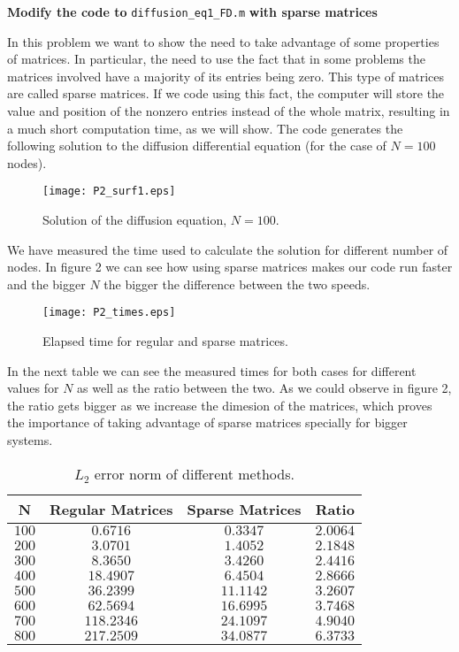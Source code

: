 \textbf{Modify the code to} \verb+diffusion_eq1_FD.m+  \textbf{with sparse matrices}

\vspace{0.3in}

In this problem we want to show the need to take advantage of some properties of matrices. In particular, the need to use the fact that in some problems the matrices involved have a majority of its entries being zero. This type of matrices are called sparse matrices. If we code using this fact, the computer will store the value and position of the nonzero entries instead of the whole matrix, resulting in a much short computation time, as we will show. The code generates the following solution to the diffusion differential equation (for the case of $N=100$ nodes).
\begin{figure}[H]
\centering     %
{\texttt{[image: P2\_surf1.eps]}}
\caption{Solution of the diffusion equation, $N=100$.}
\end{figure}

We have measured the time used to calculate the solution for different number of nodes. In figure 2 we can see how using sparse matrices makes our code run faster and the bigger $N$ the bigger the difference between the two speeds. 
\begin{figure}[H]
\centering     %
{\texttt{[image: P2\_times.eps]}}
\caption{Elapsed time for regular and sparse matrices.}
\end{figure}

In the next table we can see the measured times for both cases for different values for $N$ as well as the ratio between the two. As we could observe in figure 2, the ratio gets bigger as we increase the dimesion of the matrices, which proves the importance of taking advantage of sparse matrices specially for bigger systems.

\begin{table}[H]
\centering
\begin{tabular}{c|c|c|c}
N  & Regular Matrices & Sparse Matrices & Ratio\\
\hline
$100$ & $0.6716$ & $   0.3347$ & $   2.0064$\\
$200$ & $3.0701$ & $    1.4052$ & $    2.1848$\\
$300$ & $8.3650$ & $    3.4260$ & $    2.4416$\\
$400$ & $18.4907$ & $    6.4504$ & $    2.8666$\\
$500$ & $36.2399$ & $   11.1142$ & $    3.2607$\\
$600$ & $62.5694$ & $   16.6995$ & $    3.7468$\\
$700$ & $118.2346$ & $   24.1097$ & $    4.9040$\\
$800$ & $  217.2509$ & $   34.0877$ & $    6.3733$\\
\end{tabular}
\caption{$L_2$ error norm of different methods.}
\end{table}

